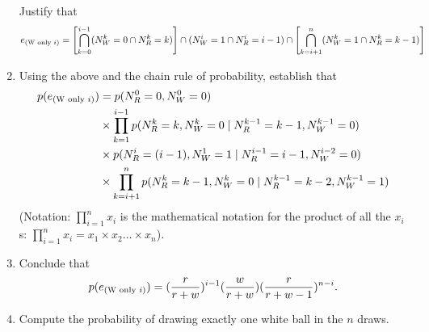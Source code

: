 \documentclass{article}
\begin{document}
\begin{enumerate}
  Justify that
  \[e_{(\textsc{W} \textnormal{ only } i)} = \left [ \bigcap^{i-1}_{k = 0} (N^k_W = 0 \cap N^k_R = k) \right ] \cap (N^{i}_W = 1 \cap N^{i}_R = i-1) \cap \left [\bigcap^n_{k=i+1} (N^k_W = 1 \cap N^k_R = k-1) \right ]\]
\item Using the above and the chain rule of probability, establish that
  \[ \begin{aligned}p(e_{(\textsc{W} \textnormal{ only } i)}) &= p(N^0_R = 0, N^0_W = 0)\\&\times \prod^{i-1}_{k=1}  p(N^k_R = k, N^k_W = 0 \mid  N^{k-1}_R = k-1, N^{k-1}_W = 0) \\&\times p(N^{i}_R = (i-1), N^1_W = 1 \mid  N^{i-1}_R = i-1, N^{i-2}_W = 0) \\&\times \prod^{n}_{k=i+1}  p(N^k_R = k-1, N^k_W = 0 \mid  N^{k-1}_R = k-2, N^{k-1}_W = 1) \end{aligned} \]
  (Notation: $\prod^n_{i=1} x_i$ is the mathematical notation for the product of all the $x_i$s: $\prod^n_{i=1} x_i = x_1 \times x_2 \dots \times x_n$).
\item Conclude that
  \[ p(e_{(\textsc{W} \textnormal{ only } i)}) = (\frac{r}{r+w})^{i-1}(\frac{w}{r+w})(\frac{r}{r+w-1})^{n-i}.\]

\item Compute the probability of drawing exactly one white ball in the $n$ draws.
  \end{enumerate}
\end{document}
